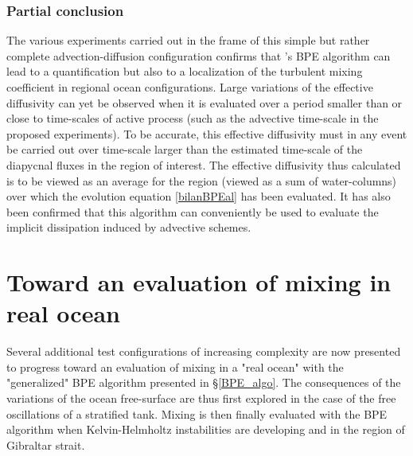 \subsubsection{Partial conclusion}
The various experiments carried out in the frame of this simple but rather complete advection-diffusion configuration confirms that \cite{winters_available_1995}'s BPE algorithm can lead to a quantification but also to a localization of the turbulent mixing coefficient in regional ocean configurations. Large variations of the effective diffusivity can yet be observed when it is evaluated over a period smaller than or close to time-scales of active process (such as the advective time-scale in the proposed experiments). To be accurate, this effective diffusivity must in any event be carried out over time-scale larger than the estimated time-scale of the diapycnal fluxes in the region of interest. The effective diffusivity thus calculated is to be viewed as an average for the region (viewed as a sum of water-columns) over which the evolution equation \ref{bilanBPEal} has been evaluated. It has also been confirmed that this algorithm can conveniently be used to evaluate the implicit dissipation induced by advective schemes.

\section{Toward an evaluation of mixing in real ocean}
Several additional test configurations of increasing complexity are now presented to progress toward an evaluation of mixing in a "real ocean" with the "generalized" BPE algorithm presented in \S \ref{BPE_algo}. The consequences of the variations of the ocean free-surface are thus first explored in the case of the free oscillations of a stratified tank. Mixing is then finally evaluated with the BPE algorithm when Kelvin-Helmholtz instabilities are developing and in the region of Gibraltar strait.

